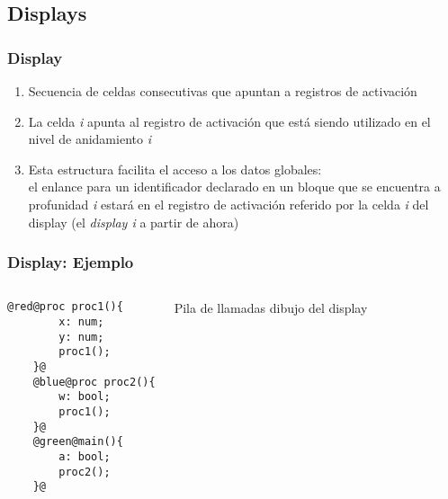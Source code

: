 \documentclass[hyperref={pdfpagelabels=false},tree-dvips]{beamer}
\begin{document}
\subsection{Displays}
\begin{frame}[fragile]
\frametitle{Display}

\begin{enumerate}[<+->]%
	\item Secuencia de celdas consecutivas que apuntan a registros de activación
	\item La celda \emph{i} apunta al registro de activación que está siendo utilizado en el nivel de anidamiento \emph{i}
	\item Esta estructura facilita el acceso a los datos globales:\\
		el enlance para un identificador declarado en un bloque que se encuentra a profunidad \emph{i} estará en el registro de activación referido por la celda \emph{i} del display (el \emph{display i} a partir de ahora)
\end{enumerate}

\end{frame}
\begin{frame}[fragile]
\frametitle{Display: Ejemplo}

\begin{columns}[T]
	\begin{lstlisting}[style=procesos]
	@red@proc proc1(){
	    x: num;
	    y: num;
	    proc1();
	}@
	@blue@proc proc2(){
	    w: bool;
	    proc1();
	}@
	@green@main(){
	    a: bool;
	    proc2();
	}@
	\end{lstlisting}
	Pila de llamadas
	dibujo del display
\end{columns}

\end{frame}
\end{document}
